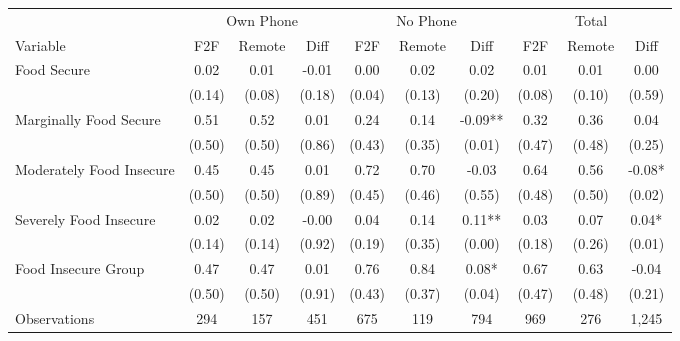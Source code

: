 \begin{tabular}{l*{9}c}
\hline\hline
 & \multicolumn{3}{c}{Own Phone} & \multicolumn{3}{c}{No Phone} & \multicolumn{3}{c}{Total}\\ 
Variable & F2F & Remote & Diff & F2F & Remote & Diff & F2F & Remote & Diff \\
\hline
Food Secure&0.02&0.01&-0.01&0.00&0.02&0.02&0.01&0.01&0.00\\
&(0.14)&(0.08)&(0.18)&(0.04)&(0.13)&(0.20)&(0.08)&(0.10)&(0.59)\\
Marginally Food Secure&0.51&0.52&0.01&0.24&0.14&-0.09**&0.32&0.36&0.04\\
&(0.50)&(0.50)&(0.86)&(0.43)&(0.35)&(0.01)&(0.47)&(0.48)&(0.25)\\
Moderately Food Insecure&0.45&0.45&0.01&0.72&0.70&-0.03&0.64&0.56&-0.08*\\
&(0.50)&(0.50)&(0.89)&(0.45)&(0.46)&(0.55)&(0.48)&(0.50)&(0.02)\\
Severely Food Insecure&0.02&0.02&-0.00&0.04&0.14&0.11**&0.03&0.07&0.04*\\
&(0.14)&(0.14)&(0.92)&(0.19)&(0.35)&(0.00)&(0.18)&(0.26)&(0.01)\\
Food Insecure Group&0.47&0.47&0.01&0.76&0.84&0.08*&0.67&0.63&-0.04\\
&(0.50)&(0.50)&(0.91)&(0.43)&(0.37)&(0.04)&(0.47)&(0.48)&(0.21)\\
\hline
Observations & 294 & 157 & 451 & 675 & 119 & 794 & 969 & 276 & 1,245 \\
\hline\hline
\end{tabular}
